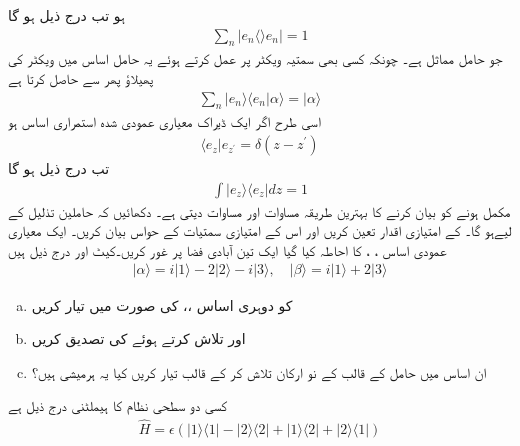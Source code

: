 ہو تب درج ذیل ہو گا 
\begin{align}
\sum_{n} | e_{n} \langle \rangle e_{n} | = 1 
\end{align}
جو حامل مماثل ہے۔ چونکہ کسی بھی سمتیہ ویکٹر  پر عمل کرتے ہوئے یہ حامل اساس 
میں ویکٹر  کی پھیلاؤ پھر سے حاصل کرتا ہے 
\begin{align}
\sum_{n} | e_{n} \rangle \langle e_{n} | \alpha \rangle = | \alpha \rangle 
\end{align}
اسی طرح اگر  ایک ڈیراک معیاری عمودی شدہ استمراری اساس ہو 
\begin{align}
\langle e_{z} | e_{z^{'}} = \delta ( z-z^{'})
\end{align}
تب درج ذیل ہو گا 
\begin{align}
\int | e_{z} \rangle \langle e_{z} | dz = 1
\end{align}
مکمل ہونے کو بیان کرنے کا بہترین طریقہ مساوات  اور مساوات  دیتی ہے۔
دکھائیں کہ حاملین تذلیل کے لیےہو گا۔  کے امتیازی اقدار تعین کریں اور اس کے امتیازی سمتیات کے حواس بیان کریں۔
 ایک معیاری عمودی اساس ،  ،  کا احاطہ کیا گیا ایک تین آبادی فضا پر غور کریں۔کیٹ  اور  درج ذیل ہیں 
\begin{align*}
| \alpha \rangle = i | 1 \rangle -2|2\rangle -i|3\rangle , \quad | \beta \rangle = i|1\rangle +2|3\rangle 
\end{align*}
\begin{enumerate}[a.]
\item  {}    کو دوہری اساس  ،،  کی صورت میں تیار کریں 
\item  {} اور  تلاش کرتے ہوئے   کی تصدیق کریں
\item ان اساس میں حامل  کے قالب کے نو ارکان تلاش کر کے قالب  تیار کریں کیا یہ ہرمیشی ہیں؟
\end{enumerate} 
کسی دو سطحی نظام کا ہیملٹنی درج ذیل ہے 
\begin{align*}
\hat{H} = \epsilon ( | 1 \rangle \langle 1 | - |2\rangle \langle 2 | + | 1 \rangle \langle 2 | + | 2 \rangle \langle 1 | )
\end{align*}
